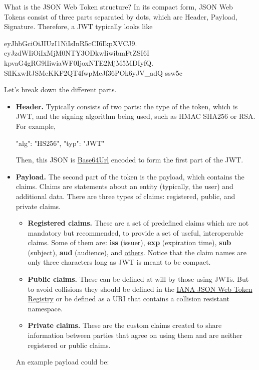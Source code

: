What is the JSON Web Token structure?
In its compact form, JSON Web Tokens consist of three parts separated by dots, which are Header, Payload, Signature.
Therefore, a JWT typically looks like
\begin{center}
    \begin{spverbatim}
        eyJhbGciOiJIUzI1NiIsInR5cCI6IkpXVCJ9.
        eyJzdWIiOiIxMjM0NTY3ODkwIiwibmFtZSI6I
        kpvaG4gRG9lIiwiaWF0IjoxNTE2MjM5MDIyfQ.
        SflKxwRJSMeKKF2QT4fwpMeJf36POk6yJV_adQ
        ssw5c
    \end{spverbatim}
\end{center}
Let's break down the different parts.
\begin{itemize}
    \item \textbf{Header.} Typically consists of two parts: the type of the token, which is JWT, and the signing algorithm
    being used, such as HMAC SHA256 or RSA\@.
    For example,

    \begin{spverbatim}
    {
        "alg": "HS256",
        "typ": "JWT"
    }
    \end{spverbatim}

    Then, this JSON is \href{https://en.wikipedia.org/wiki/Base64}{Base64Url} encoded to form the first part of the JWT\@.
    \item \textbf{Payload.} The second part of the token is the payload, which contains the claims.
    Claims are statements about an entity (typically, the user) and additional data.
    There are three types of claims: registered, public, and private claims.
    \begin{itemize}
        \item \textbf{Registered claims.} These are a set of predefined claims which are not mandatory but recommended,
        to provide a set of useful, interoperable claims.
        Some of them are: \textbf{iss} (issuer), \textbf{exp} (expiration time), \textbf{sub} (subject),
        \textbf{aud} (audience), and \href{https://tools.ietf.org/html/rfc7519#section-4.1}{others}.
        Notice that the claim names are only three characters long as JWT is meant to be compact.
        \item \textbf{Public claims.} These can be defined at will by those using JWTs. But to avoid collisions they
        should be defined in the \href{https://www.iana.org/assignments/jwt/jwt.xhtml}{IANA JSON Web Token Registry}
        or be defined as a URI that contains a collision resistant namespace.
        \item \textbf{Private claims.} These are the custom claims created to share information between parties that
        agree on using them and are neither registered or public claims.
    \end{itemize}
    An example payload could be:


\end{itemize}
